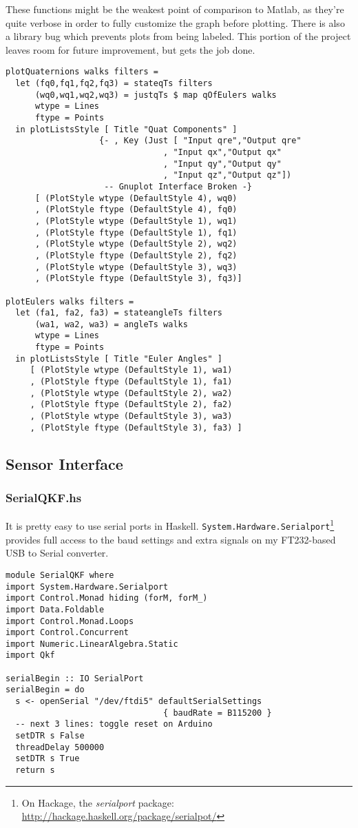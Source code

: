 \documentclass[12pt]{report}
\begin{document}
These functions might be the weakest point of comparison to Matlab, as they're quite verbose in order to fully customize the graph before plotting. There is also a library bug which prevents plots from being labeled. This portion of the project leaves room for future improvement, but gets the job done.

\begin{lstlisting}
plotQuaternions walks filters =
  let (fq0,fq1,fq2,fq3) = stateqTs filters
      (wq0,wq1,wq2,wq3) = justqTs $ map qOfEulers walks
      wtype = Lines
      ftype = Points
  in plotListsStyle [ Title "Quat Components" ]
                   {- , Key (Just [ "Input qre","Output qre"
                                , "Input qx","Output qx"
                                , "Input qy","Output qy"
                                , "Input qz","Output qz"]) 
                    -- Gnuplot Interface Broken -}
      [ (PlotStyle wtype (DefaultStyle 4), wq0)
      , (PlotStyle ftype (DefaultStyle 4), fq0) 
      , (PlotStyle wtype (DefaultStyle 1), wq1)
      , (PlotStyle ftype (DefaultStyle 1), fq1)
      , (PlotStyle wtype (DefaultStyle 2), wq2)
      , (PlotStyle ftype (DefaultStyle 2), fq2)
      , (PlotStyle wtype (DefaultStyle 3), wq3)
      , (PlotStyle ftype (DefaultStyle 3), fq3)]
                                                      
plotEulers walks filters =
  let (fa1, fa2, fa3) = stateangleTs filters
      (wa1, wa2, wa3) = angleTs walks
      wtype = Lines
      ftype = Points
  in plotListsStyle [ Title "Euler Angles" ]
     [ (PlotStyle wtype (DefaultStyle 1), wa1)
     , (PlotStyle ftype (DefaultStyle 1), fa1)
     , (PlotStyle wtype (DefaultStyle 2), wa2)
     , (PlotStyle ftype (DefaultStyle 2), fa2)
     , (PlotStyle wtype (DefaultStyle 3), wa3)
     , (PlotStyle ftype (DefaultStyle 3), fa3) ]
\end{lstlisting}

\subsection{Sensor Interface}
\subsubsection{SerialQKF.hs}
It is pretty easy to use serial ports in Haskell. \lstinline$System.Hardware.Serialport$\footnote{On Hackage, the \emph{serialport} package: \url{http://hackage.haskell.org/package/serialpot/}} provides full access to the baud settings and extra signals on my FT232-based USB to Serial converter.
\begin{lstlisting}
module SerialQKF where
import System.Hardware.Serialport
import Control.Monad hiding (forM, forM_)
import Data.Foldable
import Control.Monad.Loops
import Control.Concurrent
import Numeric.LinearAlgebra.Static
import Qkf

serialBegin :: IO SerialPort
serialBegin = do
  s <- openSerial "/dev/ftdi5" defaultSerialSettings 
                                { baudRate = B115200 }
  -- next 3 lines: toggle reset on Arduino
  setDTR s False
  threadDelay 500000
  setDTR s True
  return s

\end{lstlisting}
\end{document}
